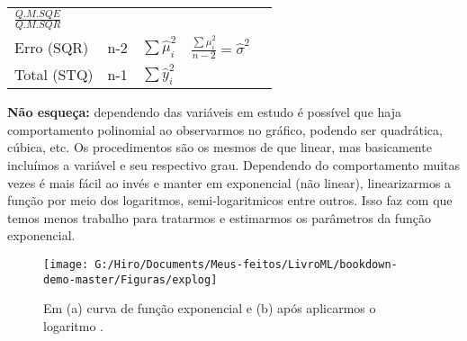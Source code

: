 \documentclass[
  openany]{book}
\begin{document}
\begin{longtable}[]{@{}lllll@{}}
\begin{minipage}[t]{0.17\columnwidth}
\(\frac{Q.M.SQE}{Q.M.SQR}\)\strut
\end{minipage}\tabularnewline
\begin{minipage}[t]{0.17\columnwidth}\raggedright
Erro (SQR)\strut
\end{minipage} & \begin{minipage}[t]{0.17\columnwidth}\raggedright
n-2\strut
\end{minipage} & \begin{minipage}[t]{0.17\columnwidth}\raggedright
\(\sum \hat{\mu}_i^2\)\strut
\end{minipage} & \begin{minipage}[t]{0.17\columnwidth}\raggedright
\(\frac{\sum \mu_i^2}{n-2}=\hat{\sigma}^2\)\strut
\end{minipage} & \begin{minipage}[t]{0.17\columnwidth}\raggedright
\strut
\end{minipage}\tabularnewline
\begin{minipage}[t]{0.17\columnwidth}\raggedright
Total (STQ)\strut
\end{minipage} & \begin{minipage}[t]{0.17\columnwidth}\raggedright
n-1\strut
\end{minipage} & \begin{minipage}[t]{0.17\columnwidth}\raggedright
\(\sum \hat{y}_i^2\)\strut
\end{minipage} & \begin{minipage}[t]{0.17\columnwidth}\raggedright
\strut
\end{minipage} & \begin{minipage}[t]{0.17\columnwidth}\raggedright
\strut
\end{minipage}\tabularnewline
\bottomrule
\end{longtable}

\textbf{Não esqueça:} dependendo das variáveis em estudo é possível que haja comportamento polinomial ao observarmos no gráfico, podendo ser quadrática, cúbica, etc. Os procedimentos são os mesmos de que linear, mas basicamente incluímos a variável e seu respectivo grau. Dependendo do comportamento muitas vezes é mais fácil ao invés e manter em exponencial (não linear), linearizarmos a função por meio dos logaritmos, semi-logaritmicos entre outros. Isso faz com que temos menos trabalho para tratarmos e estimarmos os parâmetros da função exponencial.

\begin{figure}

{\centering \texttt{[image: G:/Hiro/Documents/Meus-feitos/LivroML/bookdown-demo-master/Figuras/explog]} 

}

\caption{Em (a) curva de função exponencial e (b) após aplicarmos o logaritmo \citep{gujarati2011econometria}.}\label{fig:explog}
\end{figure}
\end{document}
